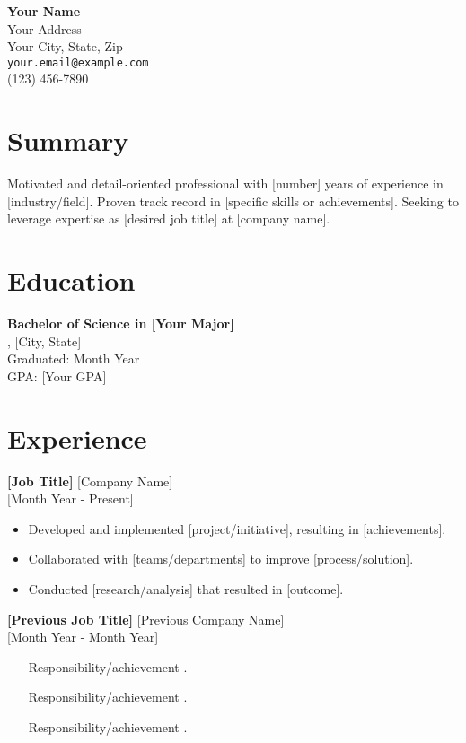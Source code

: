 \documentclass[a4paper,10pt]{article}
\begin{document}
\begin{center}
    {\LARGE \textbf{Your Name}} \\
    \vspace{5pt}
    Your Address \\
    Your City, State, Zip \\
    \texttt{your.email@example.com} \\
    (123) 456-7890
\end{center}

\section*{Summary}
Motivated and detail-oriented professional with [number] years of experience in [industry/field]. Proven track record in [specific skills or achievements]. Seeking to leverage expertise as [desired job title] at [company name].

\section*{Education}
\textbf{Bachelor of Science in [Your Major]} \\
[University Name], [City, State] \\
Graduated: Month Year \\
GPA: [Your GPA]

\section*{Experience}
\textbf{[Job Title]} \hfill [Company Name] \\
[City, State] \hfill [Month Year - Present]
\begin{itemize}[left=0pt]
    \item Developed and implemented [project/initiative], resulting in [achievements].
    \item Collaborated with [teams/departments] to improve [process/solution].
    \item Conducted [research/analysis] that resulted in [outcome].
\end{itemize}

\textbf{[Previous Job Title]} \hfill [Previous Company Name] \\
[City, State] \hfill [Month Year - Month Year]
\begin{itemize}[left=0pt]
    \item [Responsibility/achievement].
    \item [Responsibility/achievement].
    \item [Responsibility/achievement].
\end{itemize}
\end{document}
